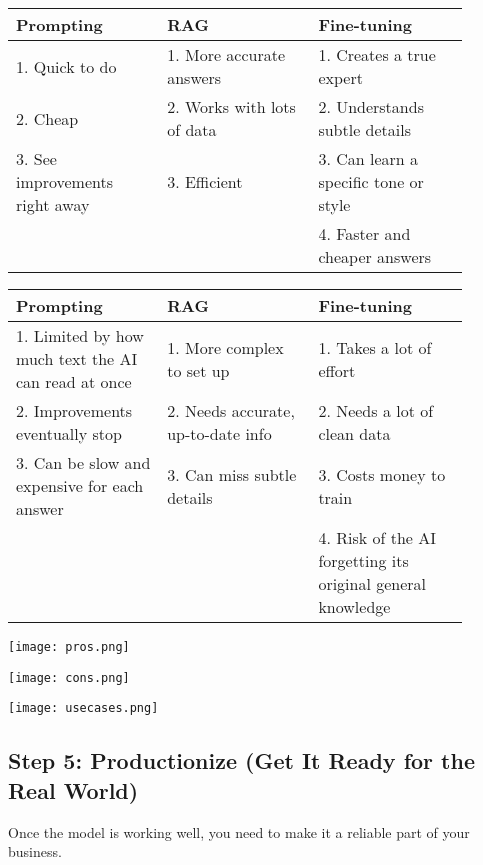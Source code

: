 \documentclass[a4paper, 12pt]{article}
\begin{document}
\begin{tcolorbox}[title=Pros: The Good Stuff, boxrule=1pt, sharp corners]
\begin{tabular}{p{0.3\linewidth} | p{0.3\linewidth} | p{0.3\linewidth}}
    \textbf{Prompting} & \textbf{RAG} & \textbf{Fine-tuning} \\
    \hline
    1. Quick to do & 1. More accurate answers & 1. Creates a true expert \\
    2. Cheap & 2. Works with lots of data & 2. Understands subtle details \\
    3. See improvements right away & 3. Efficient & 3. Can learn a specific tone or style \\
     &  & 4. Faster and cheaper answers \\
\end{tabular}
\end{tcolorbox}

\begin{tcolorbox}[title=Cons: The Downsides, boxrule=1pt, sharp corners]
\begin{tabular}{p{0.3\linewidth} | p{0.3\linewidth} | p{0.3\linewidth}}
    \textbf{Prompting} & \textbf{RAG} & \textbf{Fine-tuning} \\
    \hline
    1. Limited by how much text the AI can read at once & 1. More complex to set up & 1. Takes a lot of effort \\
    2. Improvements eventually stop & 2. Needs accurate, up-to-date info & 2. Needs a lot of clean data \\
    3. Can be slow and expensive for each answer & 3. Can miss subtle details & 3. Costs money to train \\
     &  & 4. Risk of the AI forgetting its original general knowledge \\
\end{tabular}
\end{tcolorbox}

\begin{center}
\texttt{[image: pros.png]}
\end{center}


\begin{center}
\texttt{[image: cons.png]}
\end{center}


\begin{center}
\texttt{[image: usecases.png]}
\end{center}

\newpage
\subsection*{Step 5: Productionize (Get It Ready for the Real World)}
Once the model is working well, you need to make it a reliable part of your business.
\end{document}
